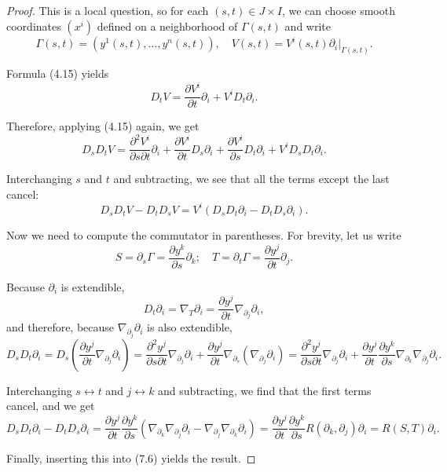 \begin{proof}
This is a local question, so for each $(s,t) \in J \times I$, we can choose smooth coordinates $(x^i)$ defined on a neighborhood of $\Gamma(s,t)$ and write
\[
\Gamma(s,t) = (y^1(s,t), \ldots, y^n(s,t)), \quad V(s,t) = V^i(s,t) \partial_i |_{\Gamma(s,t)}.
\]

Formula (4.15) yields
\[
D_t V = \frac{\partial V^i}{\partial t} \partial_i + V^i D_t \partial_i.
\]

Therefore, applying (4.15) again, we get
\[
D_s D_t V = \frac{\partial^2 V^i}{\partial s \partial t} \partial_i + \frac{\partial V^i}{\partial t} D_s \partial_i + \frac{\partial V^i}{\partial s} D_t \partial_i + V^i D_s D_t \partial_i.
\]

Interchanging $s$ and $t$ and subtracting, we see that all the terms except the last cancel:
\begin{equation}
D_s D_t V - D_t D_s V = V^i (D_s D_t \partial_i - D_t D_s \partial_i). \tag{7.6}
\end{equation}

Now we need to compute the commutator in parentheses. For brevity, let us write
\[
S = \partial_s \Gamma = \frac{\partial y^k}{\partial s} \partial_k; \quad T = \partial_t \Gamma = \frac{\partial y^j}{\partial t} \partial_j.
\]

Because $\partial_i$ is extendible,
\[
D_t \partial_i = \nabla_T \partial_i = \frac{\partial y^j}{\partial t} \nabla_{\partial_j} \partial_i,
\]
and therefore, because $\nabla_{\partial_j} \partial_i$ is also extendible,
\[
D_s D_t \partial_i = D_s\left(\frac{\partial y^j}{\partial t}\nabla_{\partial_j} \partial_i\right)
= \frac{\partial^2 y^j}{\partial s \partial t}\nabla_{\partial_j} \partial_i + \frac{\partial y^j}{\partial t}\nabla_{\partial_s}(\nabla_{\partial_j} \partial_i)
= \frac{\partial^2 y^j}{\partial s \partial t}\nabla_{\partial_j} \partial_i + \frac{\partial y^j}{\partial t}\frac{\partial y^k}{\partial s}\nabla_{\partial_k} \nabla_{\partial_j} \partial_i.
\]

Interchanging $s \leftrightarrow t$ and $j \leftrightarrow k$ and subtracting, we find that the first terms cancel, and we get
\[
D_s D_t \partial_i - D_t D_s \partial_i = \frac{\partial y^j}{\partial t}\frac{\partial y^k}{\partial s}(\nabla_{\partial_k} \nabla_{\partial_j} \partial_i - \nabla_{\partial_j} \nabla_{\partial_k} \partial_i)
= \frac{\partial y^j}{\partial t}\frac{\partial y^k}{\partial s}R(\partial_k, \partial_j)\partial_i = R(S,T)\partial_i.
\]

Finally, inserting this into (7.6) yields the result.
\end{proof}

